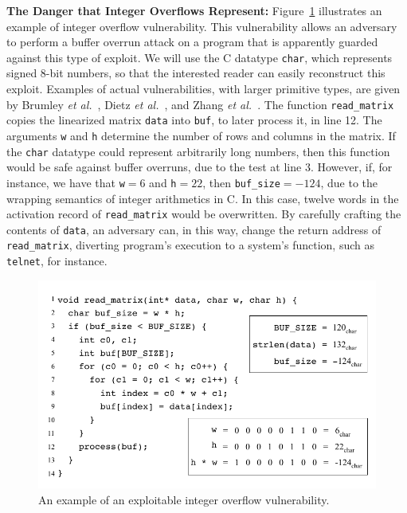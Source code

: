 \documentclass{sigplanconf}[10pt]
\begin{document}
\noindent
\textbf{The Danger that Integer Overflows Represent: }
Figure~\ref{fig:ex_buffer_overflow} illustrates an example of integer
overflow vulnerability.
This vulnerability allows an adversary to perform a buffer overrun attack
on a program that is apparently guarded against this type of exploit.
We will use the C datatype \texttt{char}, which represents
signed 8-bit numbers, so that the interested reader can easily
reconstruct this exploit.
Examples of actual vulnerabilities, with larger primitive types, are given
by Brumley {\em et al.}~\cite{Brumley07}, Dietz {\em et al.}~\cite{Dietz12},
and Zhang {\em et al.}~\cite{Zhang10}.
The function \texttt{read\_matrix} copies the linearized matrix \texttt{data}
into \texttt{buf}, to later process it, in line 12.
The arguments \texttt{w} and \texttt{h} determine the number of rows and
columns in the matrix.
If the \texttt{char} datatype could represent arbitrarily long numbers, then
this function would be safe against buffer overruns, due to the test at
line 3.
However, if, for instance, we have that \texttt{w}$= 6$ and \texttt{h}$= 22$,
then \texttt{buf\_size}$= -124$, due to the wrapping semantics of
integer arithmetics in C.
In this case, twelve words in the activation record of \texttt{read\_matrix}
would be overwritten.
By carefully crafting the contents of \texttt{data}, an adversary can, in this
way, change the return address of \texttt{read\_matrix}, diverting program's
execution to a system's function, such as \texttt{telnet}, for instance.

\begin{figure}[t!]
\begin{center}
\includegraphics[width=\columnwidth]{images/ex_buffer_overflow}
\end{center}
\caption{\label{fig:ex_buffer_overflow}
An example of an exploitable integer overflow vulnerability.}
\end{figure}
\end{document}
